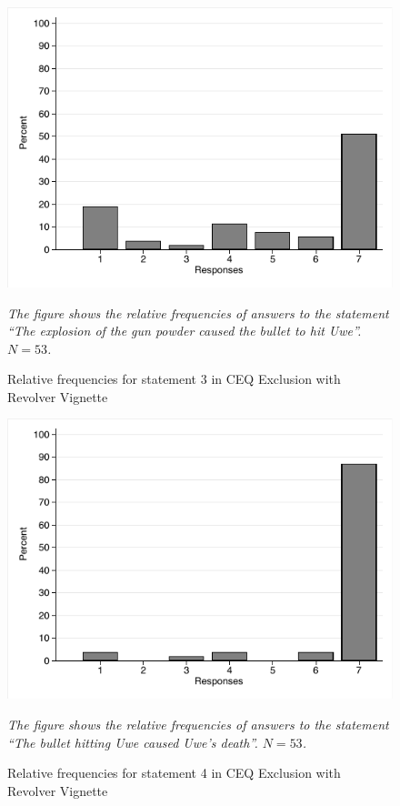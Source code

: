 \documentclass[egregdoesnotlikesansseriftitles,12pt]{scrartcl}
\begin{document}
\begin{figure}[H]
   \centering
   \includegraphics[scale=0.8]{figures/rev_ceq_hist_3.pdf}
   \begin{minipage}{0.9\linewidth}
   \footnotesize
   \emph{The figure shows the relative frequencies of answers to the statement ``The explosion of the gun powder caused the bullet to hit Uwe''. $N=53$.}
   \end{minipage}
   \caption{Relative frequencies for statement 3 in CEQ Exclusion with Revolver Vignette}
   \label{fig:rev_ceq_hist_3}
\end{figure}

\begin{figure}[H]
   \centering
   \includegraphics[scale=0.8]{figures/rev_ceq_hist_4.pdf}
   \begin{minipage}{0.9\linewidth}
   \footnotesize
   \emph{The figure shows the relative frequencies of answers to the statement ``The bullet hitting Uwe caused Uwe's death''. $N=53$.}
   \end{minipage}
   \caption{Relative frequencies for statement 4 in CEQ Exclusion with Revolver Vignette}
   \label{fig:rev_ceq_hist_4}
\end{figure}
\end{document}
